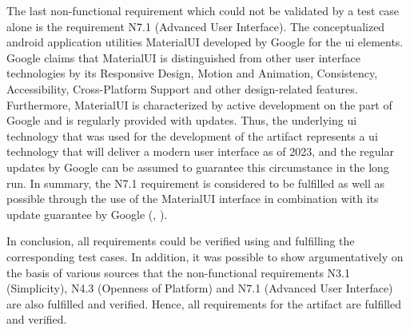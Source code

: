 The last non-functional requirement which could not be validated by a test case alone is the requirement N7.1 (Advanced User Interface). The conceptualized android application utilities MaterialUI developed by Google for the \ac{ui} elements. Google claims that MaterialUI is distinguished from other user interface technologies by its Responsive Design, Motion and Animation, Consistency, Accessibility, Cross-Platform Support and other design-related features. Furthermore, MaterialUI is characterized by active development on the part of Google and is regularly provided with updates. Thus, the underlying \ac{ui} technology that was used for the development of the artifact represents a \ac{ui} technology that will deliver a modern user interface as of 2023, and the regular updates by Google can be assumed to guarantee this circumstance in the long run. In summary, the N7.1 requirement is considered to be fulfilled as well as possible through the use of the MaterialUI interface in combination with its update guarantee by Google (\cite{Google.2023c}, \cite{Google.2023}). 

In conclusion, all requirements could be verified using and fulfilling the corresponding test cases. In addition, it was possible to show argumentatively on the basis of various sources that the non-functional requirements  N3.1 (Simplicity), N4.3 (Openness of Platform) and N7.1 (Advanced User Interface) are also fulfilled and verified. Hence, all requirements for the artifact are fulfilled and verified.

